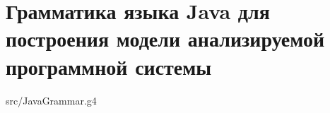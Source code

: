\chapter{Грамматика языка Java для построения модели анализируемой программной
системы}
\label{sec:java_grammar}


{src/JavaGrammar.g4}
